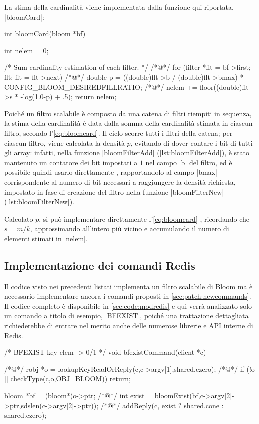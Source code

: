La stima della cardinalità viene implementata dalla funzione qui riportata, \cverb|bloomCard|:

\begin{commentedsource}[style=csource,caption=Stima della cardinalità]
int bloomCard(bloom *bf) {
    int nelem = 0;

    /* Sum cardinality estimation of each filter. */
/*@\lnote@*/    for (filter *flt = bf->first; flt; flt = flt->next) {
/*@\lnote@*/        double p = ((double)flt->b / (double)flt->bmax) * CONFIG_BLOOM_DESIREDFILLRATIO;
/*@\lnote@*/        nelem += floor((double)flt->s * -log(1.0-p) + .5);
    }
    return nelem;
}
\end{commentedsource}

Poiché un filtro scalabile è composto da una catena di filtri riempiti in sequenza, la stima
della cardinalità è data dalla somma della cardinalità stimata in ciascun filtro, secondo 
l'\autoref{eq:bloomcard}. Il ciclo  scorre tutti i filtri della catena; per ciascun
filtro, viene calcolata la densità $p$, evitando di dover contare i bit di tutti gli array: infatti,
nella funzione \cverb|bloomFilterAdd| (\autoref{lst:bloomFilterAdd}), è stato mantenuto un contatore
dei bit impostati a $1$ nel campo \cverb|b| del filtro, ed è possibile quindi usarlo direttamente
, rapportandolo al campo \cverb|bmax| corrispondente al numero di bit necessari a
raggiungere la densità richiesta, impostato in fase di creazione del filtro nella funzione
\cverb|bloomFilterNew| (\autoref{lst:bloomFilterNew}). 

Calcolato $p$, si può implementare direttamente l'\autoref{eq:bloomcard} , ricordando che
$s = m/k$, approssimando all'intero più vicino e accumulando il numero di elementi stimati in
\cverb|nelem|.

\subsection{Implementazione dei comandi Redis}

Il codice visto nei precedenti listati implementa un filtro scalabile di Bloom ma è necessario
implementare ancora i comandi proposti in \autoref{sec:patch:newcommands}. Il codice completo è
disponibile in \autoref{sec:code:modredis} e qui verrà analizzato solo un comando a
titolo di esempio, \cverb|BFEXIST|, poiché una trattazione dettagliata richiederebbe di entrare nel
merito anche delle numerose librerie e API interne di Redis.

\begin{commentedsource}[style=csource,caption=Implementazione comando BFEXIST,label={lst:bfexistCommand}]
/* BFEXIST key elem -> 0/1 */
void bfexistCommand(client *c) {
/*@\lnote@*/    robj *o = lookupKeyReadOrReply(c,c->argv[1],shared.czero);
/*@\lnote@*/    if (!o || checkType(c,o,OBJ_BLOOM)) {
        return;
    }

    bloom *bf = (bloom*)o->ptr;
/*@\lnote@*/    int exist = bloomExist(bf,c->argv[2]->ptr,sdslen(c->argv[2]->ptr));
/*@\lnote@*/    addReply(c, exist ? shared.cone : shared.czero);
}
\end{commentedsource}

